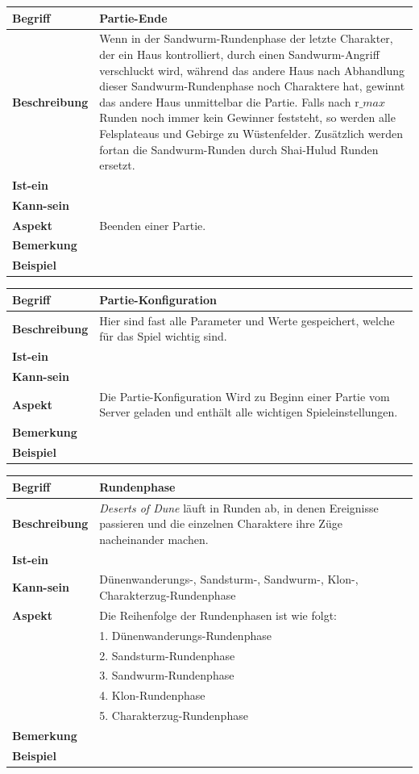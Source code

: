 \documentclass{uulm-assignment}
\newcounter{fa}
\begin{document}
\begin{tabularx}{16cm}{|l|X|}
\hline
\textbf{Begriff} & \textbf{Partie-Ende} \\
\hline
\textbf{Beschreibung} & Wenn in der Sandwurm-Rundenphase der letzte Charakter, der ein Haus kontrolliert, durch einen Sandwurm-Angriff verschluckt wird, während das andere Haus nach Abhandlung dieser Sandwurm-Rundenphase noch Charaktere hat, gewinnt das andere Haus unmittelbar die Partie. Falls nach r$\_max$ Runden noch immer kein Gewinner feststeht, so werden alle Felsplateaus und Gebirge zu Wüstenfelder. Zusätzlich werden fortan die Sandwurm-Runden durch Shai-Hulud Runden ersetzt.\\
\hline
\textbf{Ist-ein} & \\
\hline
\textbf{Kann-sein} & \\
\hline
\textbf{Aspekt} & Beenden einer Partie.\\
\hline
\textbf{Bemerkung} &  \\
\hline
\textbf{Beispiel} &  \\
\hline
\end{tabularx}

\begin{tabularx}{16cm}{|l|X|}
\hline
\textbf{Begriff} & \textbf{Partie-Konfiguration} \\
\hline
\textbf{Beschreibung} & Hier sind fast alle Parameter und Werte gespeichert, welche für das Spiel wichtig sind. \\
\hline
\textbf{Ist-ein} & \\
\hline
\textbf{Kann-sein} & \\
\hline
\textbf{Aspekt} & Die Partie-Konfiguration Wird zu Beginn einer Partie vom Server geladen und enthält alle wichtigen Spieleinstellungen.\\
\hline
\textbf{Bemerkung} &  \\
\hline
\textbf{Beispiel} &  \\
\hline
\end{tabularx}

\begin{tabularx}{16cm}{|l|X|}
\hline
\textbf{Begriff} & \textbf{Rundenphase} \\
\hline
\textbf{Beschreibung} & \textit{Deserts of Dune} läuft in Runden ab, in denen Ereignisse passieren und die einzelnen Charaktere ihre Züge nacheinander machen. \\
\hline
\textbf{Ist-ein} & \\
\hline
\textbf{Kann-sein} & Dünenwanderungs-, Sandsturm-, Sandwurm-, Klon-, Charakterzug-Rundenphase\\
\hline
\textbf{Aspekt} & Die Reihenfolge der Rundenphasen ist wie folgt:\\
& 1. Dünenwanderungs-Rundenphase\\
& 2. Sandsturm-Rundenphase\\
& 3. Sandwurm-Rundenphase\\
& 4. Klon-Rundenphase\\
& 5. Charakterzug-Rundenphase\\
\hline
\textbf{Bemerkung} &  \\
\hline
\textbf{Beispiel} &  \\
\hline
\end{tabularx}
\end{document}
